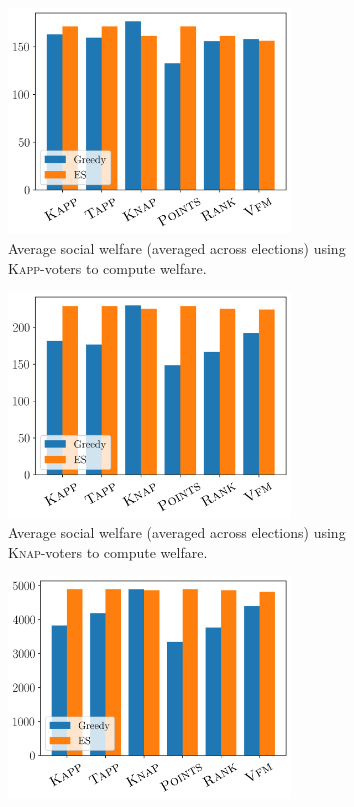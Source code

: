 \documentclass[letterpaper]{article} %
\newcommand{\knap}{\textsc{Knap}}
\newcommand{\kapp}{\textsc{Kapp}}
\begin{document}
\begin{figure}[ht]
     \centering
          \begin{subfigure}[b]{0.45\textwidth}
         \centering
       \includegraphics[width=7.5cm]{experiment/k_approval_welfare.png}
\caption{Average social welfare (averaged across elections) using \kapp{}-voters to compute welfare.
}\label{fig:kapp_welfare}
     \end{subfigure}\hfill
     \begin{subfigure}[b]{0.45\textwidth}
         \centering
         \includegraphics[width=7.5cm]{experiment/Knapsack_welfare.png}
\caption{Average social welfare (averaged across elections) using \knap{}-voters to compute welfare.
}\label{fig:knap_welfare}
     \end{subfigure}
     \hfill
     \begin{subfigure}[b]{0.45\textwidth}
         \centering
         \includegraphics[width=7.5cm]{experiment/Ranking_value_welfare.png}

\end{subfigure}
\end{figure}
\end{document}
